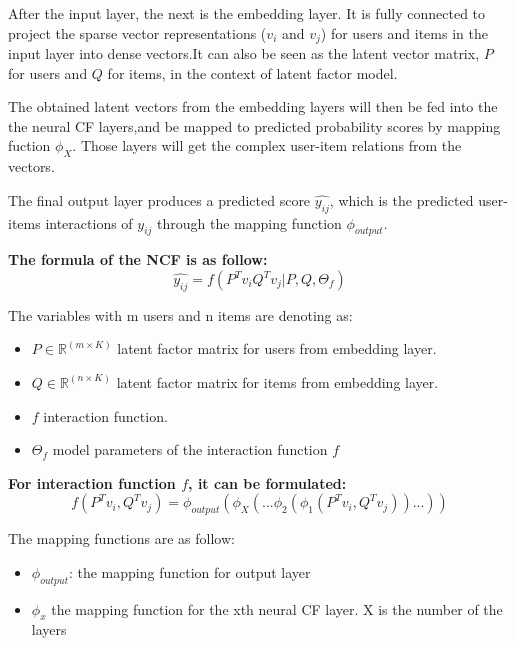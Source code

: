 \documentclass[final]{cvpr}
\newcommand{\R}{\mathbb{R}}
\begin{document}
After the input layer, the next is the embedding layer. It is fully connected to project the sparse vector representations ($v_i$ and $v_j$) for users and items in the input layer into dense vectors.It can also be seen as the latent vector matrix, $P$ for users and $Q$ for items, in the context of latent factor model.


The obtained latent vectors from the embedding layers will then be fed into the the neural CF layers,and be mapped to predicted probability scores by mapping fuction $\phi_X$. Those layers will get the complex user-item relations from the vectors.


The final output layer produces a predicted score $\hat{y_{ij}}$, which is the predicted user-items interactions of $y_{ij}$ through the mapping function $\phi_{output}$.



\bigskip
\textbf{ The formula of the NCF is as follow:}
$$\hat{y_{ij}} = f(P^T v_i Q^T v_j|P,Q,\Theta_f)$$

The variables with m users and n items are denoting as:
\begin{itemize}
    \item $P \in \R^{(m \times K)}$ latent factor matrix for users from embedding layer.
    \item $Q \in \R ^{(n \times K)}$ latent factor matrix for items from embedding layer.
    \item $f$ interaction function.    
    \item $\Theta_{f}$ model parameters of the interaction function $f$
\end{itemize}

\bigskip
\textbf{ For interaction function $f$, it can be formulated:}
$$f(P^T v_i, Q^T v_j) = \phi_{output}(\phi_X(...\phi_2(\phi_1(P^T v_i, Q^T v_j))...))$$

The mapping functions are as follow:
\begin{itemize}
    \item $\phi_{output}$: the mapping function for output layer
    \item $\phi_x$ the mapping function for the xth neural CF layer. X is the number of the layers
\end{itemize}
\end{document}
